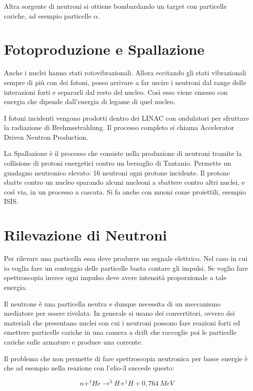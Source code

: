 Altra sorgente di neutroni si ottiene bombardando un target con particelle cariche, ad esempio particelle $\alpha$. 

\section{Fotoproduzione e Spallazione}

Anche i nuclei hanno stati rotovibrazionali. Allora eccitando gli stati vibrazionali sempre di più con dei fotoni, posso arrivare a far uscire i neutroni dal range delle interazioni forti e separarli dal resto del nucleo. Così esso viene emesso con energia che dipende dall'energia di legame di quel nucleo.

I fotoni incidenti vengono prodotti dentro dei LINAC con ondulatori per sfruttare la radiazione di Brehmsstrahlung. Il processo completo si chiama Accelerator Driven Neutron Production.


La Spallazione è il processo che consiste nella produzione di neutroni tramite la collisione di protoni energetici contro un bersaglio di Tantanio.  Permette un guadagno neutronico elevato: 16 neutroni ogni protone incidente. Il protone sbatte contro un nucleo sparando alcuni nucleoni a sbattere contro altri nuclei, e così via, in un processo a cascata. Si fa anche con muoni come proiettili, esempio ISIS.

\section{Rilevazione di Neutroni}

Per rilevare una particella essa deve produrre un segnale elettrico. Nel caso in cui io voglia fare un conteggio delle particelle basta contare gli impulsi. Se voglio fare spettroscopia invece ogni impulso deve avere intensità proporzionale a tale energia.

Il neutrone è una particella neutra e dunque necessita di un meccanismo mediatore per essere rivelata. In generale si usano dei convertitori, ovvero dei materiali che presentano nuclei con cui i neutroni possono fare reazioni forti ed emettere particelle cariche in una camera a drift che raccoglie poi le particelle cariche sulle armature e produce una corrente. 

Il problema che non permette di fare spettroscopia neutronica per basse energie è che ad esempio nella reazione con l'elio-3 succede questo:

\begin{equation}
n+^3He \longrightarrow ^3H+^1H+0,764 \ MeV
\end{equation}

